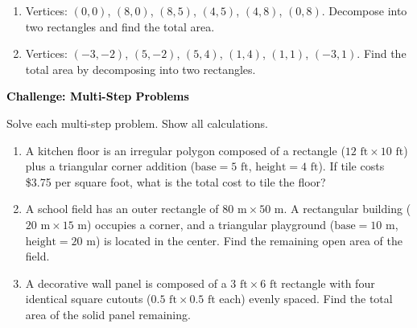 \documentclass[12pt, letterpaper, fleqn]{article}
\begin{document}
\begin{enumerate}[itemsep=2.3cm, leftmargin=0.6cm]

\item Vertices: $(0, 0)$, $(8, 0)$, $(8, 5)$, $(4, 5)$, $(4, 8)$, $(0, 8)$. Decompose into two rectangles and find the total area.

\vspace{2.2cm}

\item Vertices: $(-3, -2)$, $(5, -2)$, $(5, 4)$, $(1, 4)$, $(1, 1)$, $(-3, 1)$. Find the total area by decomposing into two rectangles.

\vspace{2.5cm}

\end{enumerate}

\newpage

\begin{tcolorbox}[colback=black!10]
\large\textcolor{black}{\textbf{Challenge: Multi-Step Problems}}
\end{tcolorbox}

\noindent
Solve each multi-step problem. Show all calculations.

\vspace{3mm}

\begin{enumerate}[itemsep=2.4cm, leftmargin=0.6cm]

\item A kitchen floor is an irregular polygon composed of a rectangle ($12\text{ ft} \times 10\text{ ft}$) plus a triangular corner addition ($\text{base} = 5\text{ ft}$, $\text{height} = 4\text{ ft}$). If tile costs \$3.75 per square foot, what is the total cost to tile the floor?

\vspace{2.3cm}

\item A school field has an outer rectangle of $80\text{ m} \times 50\text{ m}$. A rectangular building ($20\text{ m} \times 15\text{ m}$) occupies a corner, and a triangular playground ($\text{base} = 10\text{ m}$, $\text{height} = 20\text{ m}$) is located in the center. Find the remaining open area of the field.

\vspace{2.3cm}

\item A decorative wall panel is composed of a $3\text{ ft} \times 6\text{ ft}$ rectangle with four identical square cutouts ($0.5\text{ ft} \times 0.5\text{ ft}$ each) evenly spaced. Find the total area of the solid panel remaining.

\vspace{2.5cm}

\end{enumerate}
\end{document}
